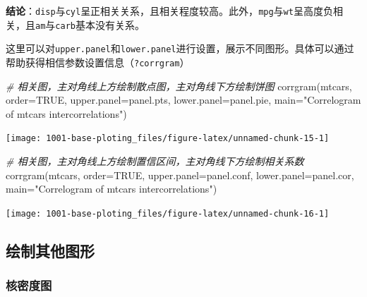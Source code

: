 \documentclass[
]{book}
\newenvironment{Shaded}{\begin{snugshade}}{\end{snugshade}}
\newcommand{\AttributeTok}[1]{\textcolor[rgb]{0.77,0.63,0.00}{#1}}
\newcommand{\CommentTok}[1]{\textcolor[rgb]{0.56,0.35,0.01}{\textit{#1}}}
\newcommand{\ConstantTok}[1]{\textcolor[rgb]{0.00,0.00,0.00}{#1}}
\newcommand{\FunctionTok}[1]{\textcolor[rgb]{0.00,0.00,0.00}{#1}}
\newcommand{\NormalTok}[1]{#1}
\newcommand{\StringTok}[1]{\textcolor[rgb]{0.31,0.60,0.02}{#1}}
\begin{document}
\textbf{结论}：\texttt{disp}与\texttt{cyl}呈正相关关系，且相关程度较高。此外，\texttt{mpg}与\texttt{wt}呈高度负相关，且\texttt{am}与\texttt{carb}基本没有关系。

这里可以对\texttt{upper.panel}和\texttt{lower.panel}进行设置，展示不同图形。具体可以通过帮助获得相信参数设置信息（\texttt{?corrgram}）

\begin{Shaded}
\begin{Highlighting}[]
\CommentTok{\# 相关图，主对角线上方绘制散点图，主对角线下方绘制饼图}
\FunctionTok{corrgram}\NormalTok{(mtcars, }\AttributeTok{order=}\ConstantTok{TRUE}\NormalTok{, }\AttributeTok{upper.panel=}\NormalTok{panel.pts, }\AttributeTok{lower.panel=}\NormalTok{panel.pie, }
         \AttributeTok{main=}\StringTok{"Correlogram of mtcars intercorrelations"}\NormalTok{) }
\end{Highlighting}
\end{Shaded}

\begin{center}\texttt{[image: 1001-base-ploting\_files/figure-latex/unnamed-chunk-15-1]} \end{center}

\begin{Shaded}
\begin{Highlighting}[]
\CommentTok{\# 相关图，主对角线上方绘制置信区间，主对角线下方绘制相关系数}
\FunctionTok{corrgram}\NormalTok{(mtcars, }\AttributeTok{order=}\ConstantTok{TRUE}\NormalTok{, }\AttributeTok{upper.panel=}\NormalTok{panel.conf, }\AttributeTok{lower.panel=}\NormalTok{panel.cor,}
         \AttributeTok{main=}\StringTok{"Correlogram of mtcars intercorrelations"}\NormalTok{) }
\end{Highlighting}
\end{Shaded}

\begin{center}\texttt{[image: 1001-base-ploting\_files/figure-latex/unnamed-chunk-16-1]} \end{center}

\hypertarget{ux7ed8ux5236ux5176ux4ed6ux56feux5f62}{%
\subsection{绘制其他图形}\label{ux7ed8ux5236ux5176ux4ed6ux56feux5f62}}

\hypertarget{ux6838ux5bc6ux5ea6ux56fe}{%
\subsubsection{核密度图}\label{ux6838ux5bc6ux5ea6ux56fe}}
\end{document}
